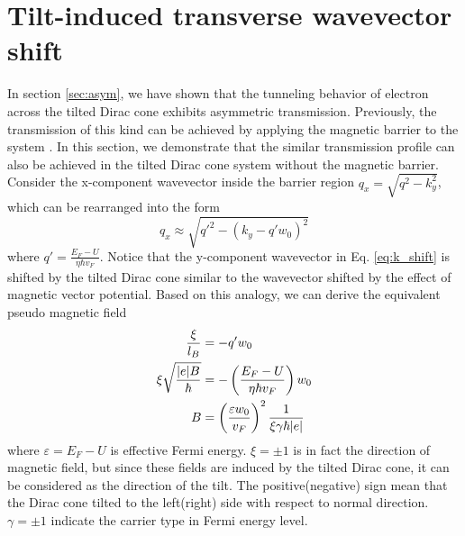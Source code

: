 \section{Tilt-induced transverse wavevector shift} \label{sec:pseudo b}
    In section \ref{sec:asym}, we have shown that the tunneling behavior of electron across the tilted Dirac cone exhibits asymmetric transmission. 
    Previously, the transmission of this kind can be achieved by applying the magnetic barrier to the system \cite{RamezaniMasir2008,RamezaniMasir2010}.
    In this section, we demonstrate that the similar transmission profile can also be achieved in the tilted Dirac cone system without the magnetic barrier.
    Consider the x-component wavevector inside the barrier region $q_x = \sqrt{q^2-k_y^2}$, which can be rearranged into the form
    \begin{equation} \label{eq:k_shift}
        q_x \approx \sqrt{q'^2 -(k_y-q'w_0)^2}
    \end{equation} 
    where $q' = \frac{E_F-U}{\eta \hbar v_F}$. 
    Notice that the y-component wavevector in Eq. \ref{eq:k_shift} is shifted by the tilted Dirac cone similar to the wavevector shifted by the effect of magnetic vector potential.
    Based on this analogy, we can derive the equivalent pseudo magnetic field
    \begin{align} \label{eq:pseudo B}
        \frac{\xi}{l_B} &= -q' w_0 \notag \\
        \xi\sqrt{\frac{|e| B}{\hbar}} &=  -\left(\frac{E_F-U}{\eta \hbar v_F}\right) w_0\notag \\
        B &= \left(\frac{\varepsilon w_0}{v_F}\right)^2 \frac{1}{\xi \gamma \hbar |e|}
    \end{align}
    where $\varepsilon = E_F-U$ is effective Fermi energy. 
    $\xi = \pm 1$ is in fact the direction of magnetic field, but since these fields are induced by the tilted Dirac cone, it can be considered as the direction of the tilt.
    The positive(negative) sign mean that the Dirac cone tilted to the left(right) side with respect to normal direction. 
    $\gamma = \pm 1$ indicate the carrier type in Fermi energy level.

